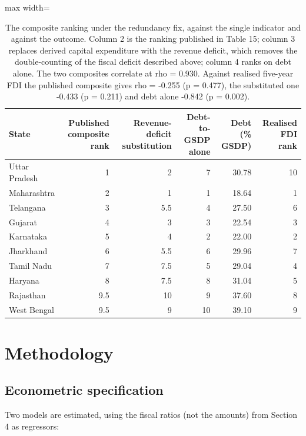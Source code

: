 \documentclass[12pt,a4paper]{article}
\begin{document}
\begin{table}[H]
\centering
\addtocounter{table}{-1}\renewcommand{\thetable}{\arabic{table}b}
\caption{The composite ranking under the redundancy fix, against the single indicator and against the outcome. Column 2 is the ranking published in Table 15; column 3 replaces derived capital expenditure with the revenue deficit, which removes the double-counting of the fiscal deficit described above; column 4 ranks on debt alone. The two composites correlate at rho = 0.930. Against realised five-year FDI the published composite gives rho = -0.255 (p = 0.477), the substituted one -0.433 (p = 0.211) and debt alone -0.842 (p = 0.002).}
\label{tab:16b}
\renewcommand{\thetable}{\arabic{table}}
\footnotesize
\begin{adjustbox}{max width=\textwidth}
\begin{tabular}{@{}lrrrrr@{}}
\toprule
State & Published composite rank & Revenue-deficit substitution & Debt-to-GSDP alone & Debt (\% GSDP) & Realised FDI rank \\
\midrule
Uttar Pradesh & 1 & 2 & 7 & 30.78 & 10 \\
Maharashtra & 2 & 1 & 1 & 18.64 & 1 \\
Telangana & 3 & 5.5 & 4 & 27.50 & 6 \\
Gujarat & 4 & 3 & 3 & 22.54 & 3 \\
Karnataka & 5 & 4 & 2 & 22.00 & 2 \\
Jharkhand & 6 & 5.5 & 6 & 29.96 & 7 \\
Tamil Nadu & 7 & 7.5 & 5 & 29.04 & 4 \\
Haryana & 8 & 7.5 & 8 & 31.04 & 5 \\
Rajasthan & 9.5 & 10 & 9 & 37.60 & 8 \\
West Bengal & 9.5 & 9 & 10 & 39.10 & 9 \\
\bottomrule
\end{tabular}
\end{adjustbox}
\end{table}

\FloatBarrier
\section{Methodology}

\subsection{Econometric specification}

Two models are estimated, using the fiscal ratios (not the amounts) from Section 4 as regressors:
\end{document}
